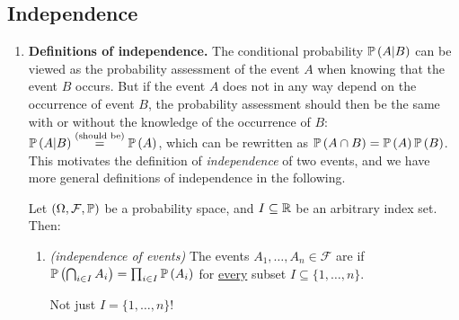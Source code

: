 \subsection{Independence}
\label{subsect:independence}
\begin{enumerate}
\item \textbf{Definitions of independence.} The conditional probability
\(\mathbb{P}\left(A|B\right)\) can be viewed as the probability assessment of the event \(A\)
when knowing that the event \(B\) occurs.  But if the event \(A\) does not in
any way depend on the occurrence of event \(B\), the probability assessment
should then be the same with or without the knowledge of the occurrence of
\(B\): \(\mathbb{P}\left(A|B\right)\overset{\text{(should be)}}{=}\mathbb{P}\left(A\right)\), which can be
rewritten as \(\mathbb{P}\left(A\cap B\right)=\mathbb{P}\left(A\right)\mathbb{P}\left(B\right)\). This motivates the definition
of \emph{independence} of two events, and we have more general definitions of
independence in the following.

Let \((\Omega,\mathcal{F},\mathbb{P})\) be a probability space, and \(I\subseteq \mathbb{R}\)
be an arbitrary index set. Then:
\begin{enumerate}
\item \emph{(independence of events)} The events \(A_1,\dotsc,A_n\in\mathcal{F}\) are  if
\(\mathbb{P}\left(\bigcap_{i\in I}^{}A_i\right)=\prod_{i\in I}^{}\mathbb{P}\left(A_i\right)\) for
\underline{every} subset \(I\subseteq \{1,\dotsc,n\}\). \begin{warning} Not
just \(I=\{1,\dotsc,n\}\)!  \end{warning}


\end{enumerate}
\end{enumerate}
